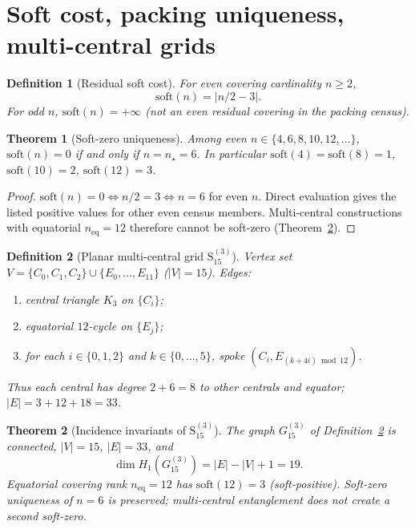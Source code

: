 \documentclass[11pt,a4paper]{article}
\newtheorem{theorem}{Theorem}
\newtheorem{definition}{Definition}
\theoremstyle{remark}
\begin{document}
\section{Soft cost, packing uniqueness, multi-central grids}
\label{sec:soft-grids}

\begin{definition}[Residual soft cost]
\label{def:soft}
For even covering cardinality $n\ge 2$,
\begin{equation}
\label{eq:soft}
\mathrm{soft}(n)=\bigl|n/2-3\bigr|.
\end{equation}
For odd $n$, $\mathrm{soft}(n)=+\infty$ (not an even residual covering in the packing census).
\end{definition}

\begin{theorem}[Soft-zero uniqueness]
\label{thm:soft-zero}
Among even $n\in\{4,6,8,10,12,\ldots\}$, $\mathrm{soft}(n)=0$ if and only if $n=n_\star=6$.
In particular $\mathrm{soft}(4)=\mathrm{soft}(8)=1$, $\mathrm{soft}(10)=2$, $\mathrm{soft}(12)=3$.
\end{theorem}

\begin{proof}
$\mathrm{soft}(n)=0\Leftrightarrow n/2=3\Leftrightarrow n=6$ for even $n$. Direct evaluation gives the listed positive values for other even census members. Multi-central constructions with equatorial $n_{\mathrm{eq}}=12$ therefore cannot be soft-zero (Theorem~\ref{thm:S15}).
\end{proof}

\begin{definition}[Planar multi-central grid $\mathrm{S}_{15}^{(3)}$]
\label{def:S15}
Vertex set $V=\{C_0,C_1,C_2\}\cup\{E_0,\ldots,E_{11}\}$ ($|V|=15$).
Edges:
\begin{enumerate}[label=(\roman*)]
\item central triangle $K_3$ on $\{C_i\}$;
\item equatorial $12$-cycle on $\{E_j\}$;
\item for each $i\in\{0,1,2\}$ and $k\in\{0,\ldots,5\}$, spoke $(C_i,E_{(k+4i)\bmod 12})$.
\end{enumerate}
Thus each central has degree $2+6=8$ to other centrals and equator; $|E|=3+12+18=33$.
\end{definition}

\begin{theorem}[Incidence invariants of $\mathrm{S}_{15}^{(3)}$]
\label{thm:S15}
The graph $G_{15}^{(3)}$ of Definition~\ref{def:S15} is connected, $|V|=15$, $|E|=33$, and
\begin{equation}
\dim H_1(G_{15}^{(3)})=|E|-|V|+1=19.
\end{equation}
Equatorial covering rank $n_{\mathrm{eq}}=12$ has $\mathrm{soft}(12)=3$ (soft-positive). Soft-zero uniqueness of $n=6$ is preserved; multi-central entanglement does not create a second soft-zero.
\end{theorem}
\end{document}
